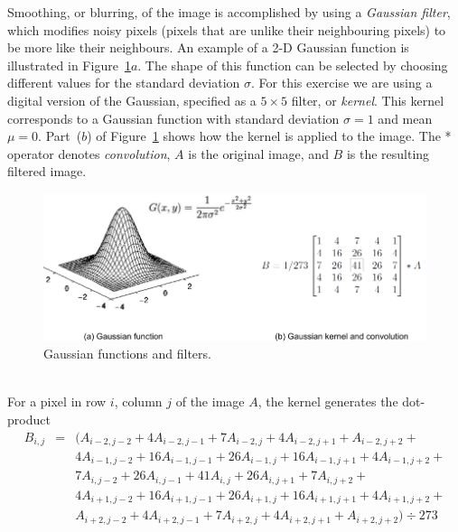 \documentclass[epsfig,10pt,fullpage]{article}
\begin{document}
\noindent
Smoothing, or blurring, of the image is accomplished by using a {\it Gaussian filter}, which 
modifies noisy pixels (pixels that are unlike their neighbouring pixels) to be more like 
their neighbours. An example of a 2-D Gaussian function is illustrated in 
Figure~\ref{fig:gaussian}$a$. The shape of this function can be selected by choosing different 
values for the standard deviation $\sigma$. For this exercise we are using a 
digital version of the Gaussian, 
specified as a $5 \times 5$ filter, or {\it kernel}. This kernel corresponds to a Gaussian function
with standard deviation $\sigma = 1$ and mean $\mu = 0$. Part~($b$) of Figure~\ref{fig:gaussian}
shows how the kernel is applied to the image. The * operator denotes {\it convolution}, $A$ is 
the original image, and $B$ is the resulting filtered image.

\begin{figure}[h]
   \begin{center}
       \includegraphics[scale = 0.85]{figures/gaussian.pdf}
   \end{center}
   \caption{Gaussian functions and filters.}
	\label{fig:gaussian}
\end{figure}


~\\
\noindent
For a pixel in row $i$, column $j$ of the image $A$, the kernel generates the dot-product
\begin{eqnarray*}
    B_{i, j}&=& (A_{i-2, j-2} + 4 A_{i-2, j-1} + 7 A_{i-2, j} + 4 A_{i-2, j+1} + A_{i-2, j+2} +\\
    &&4 A_{i-1, j-2} + 16 A_{i-1, j-1} + 26 A_{i-1, j} + 16 A_{i-1, j+1} + 4 A_{i-1, j+2} +\\
    &&7 A_{i, j-2} + 26 A_{i, j-1} + 41 A_{i, j} + 26 A_{i, j+1} + 7 A_{i, j+2} +\\
    &&4 A_{i+1, j-2} + 16 A_{i+1, j-1} + 26 A_{i+1, j} + 16 A_{i+1, j+1} + 4 A_{i+1, j+2} +\\
    &&A_{i+2, j-2} + 4 A_{i+2, j-1} + 7 A_{i+2, j} + 4 A_{i+2, j+1} + A_{i+2, j+2}) \div 273
\end{eqnarray*}
\end{document}

